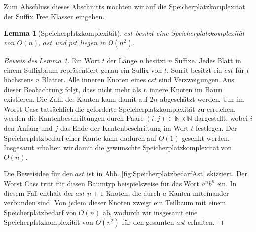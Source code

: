 \documentclass[12pt]{report}
\newtheorem{lemma}{Lemma}
\begin{document}
Zum Abschluss dieses Abschnitts möchten wir auf die Speicherplatzkomplexität der Suffix Tree Klassen eingehen.

\begin{lemma}[Speicherplatzkomplexität]
$cst$ besitzt eine Speicherplatzkomplexität von $O(n)$, $ast$ und $pst$ liegen in $O(n^2)$.
\label{lem:SpeicherplatzkomplexitaetCst}
\end{lemma}

\begin{proof}[Beweis des Lemma \ref{lem:SpeicherplatzkomplexitaetCst}]
Ein Wort $t$ der Länge $n$ besitzt $n$ Suffixe. Jedes Blatt in einem Suffixbaum repräsentiert genau ein Suffix von $t$. Somit besitzt ein $cst$ für $t$ höchstens $n$ Blätter. Alle inneren Knoten eines $cst$ sind Verzweigungen. Aus dieser Beobachtung folgt, dass nicht mehr als $n$ innere Knoten im Baum existieren. Die Zahl der Kanten kann damit auf $2n$ abgeschätzt werden. Um im Worst Case tatsächlich die geforderte Speicherplatzkomplexität zu erreichen, werden die Kantenbeschriftungen durch Paare $(i, j) \in \mathbb{N} \times \mathbb{N}$ dargestellt, wobei $i$ den Anfang und $j$ das Ende der Kantenbeschriftung im Wort $t$ festlegen. Der Speicherplatzbedarf einer Kante kann dadurch auf $O(1)$ gesenkt werden. Insgesamt erhalten wir damit die gewünschte Speicherplatzkomplexität von $O(n)$.

Die Beweisidee für den $ast$ ist in Abb. \ref{fig:SpeicherplatzbedarfAst} skizziert. Der Worst Case tritt für diesen Baumtyp beispielsweise für das Wort $a^nb^n$ ein. In diesem Fall enthält der $ast$ $n + 1$ Knoten, die durch $a$-Kanten miteinander verbunden sind. Von jedem dieser Knoten zweigt ein Teilbaum mit einem Speicherplatzbedarf von $O(n)$ ab, wodurch wir insgesamt eine Speicherplatzkomplexität von $O(n^2)$ für den gesamten $ast$ erhalten.


\end{proof}
\end{document}
